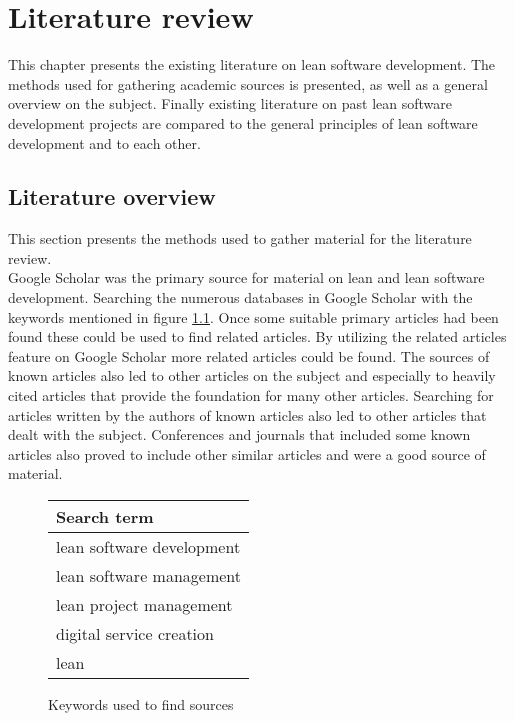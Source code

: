 
\chapter{Literature review}
\label{chapter:literature}

This chapter presents the existing literature on lean software development. The methods used for gathering academic sources is presented, as well as a general overview on the subject. Finally existing literature on past lean software development projects are compared to the general principles of lean software development and to each other.

\section{Literature overview}
\label{section:litoverview}

This section presents the methods used to gather material for the literature review.\\

Google Scholar was the primary source for material on lean and lean software development. Searching the numerous databases in Google Scholar with the keywords mentioned in figure \ref{figure:keywords}. Once some suitable primary articles had been found these could be used to find related articles. By utilizing the related articles feature on Google Scholar more related articles could be found. The sources of known articles also led to other articles on the subject and especially to heavily cited articles that provide the foundation for many other articles. Searching for articles written by the authors of known articles also led to other articles that dealt with the subject. Conferences and journals that included some known articles also proved to include other similar articles and were a good source of material.

\begin{figure}[h]
  \label{figure:keywords}
  \begin{center}
    \begin{tabular}{| l |}
      \hline
      Search term \\
      \hline
      lean software development \\
      lean software management \\
      lean project management \\
      digital service creation \\
      lean \\
      \hline
     \end{tabular}
    \caption{Keywords used to find sources}
  \end{center}
\end{figure}


